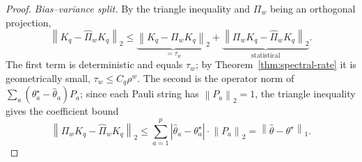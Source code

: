 \documentclass[aps,prxquantum,reprint,superscriptaddress,nofootinbib,amsmath,amssymb]{revtex4-2}
\newcommand{\norm}[1]{\left\lVert #1 \right\rVert}
\newcommand{\abs}[1]{\left\lvert #1 \right\rvert}
\begin{document}
\begin{proof}
\emph{Bias--variance split.} By the triangle inequality and $\Pi_w$ being an orthogonal projection,
\begin{equation}
    \norm{K_q-\widehat\Pi_wK_q}_2\leq\underbrace{\norm{K_q-\Pi_wK_q}_2}_{=\tau_w}+\underbrace{\norm{\Pi_wK_q-\widehat\Pi_wK_q}_2}_{\text{statistical}}.
    \label{eq:split}
\end{equation}
The first term is deterministic and equals $\tau_w$; by Theorem~\ref{thm:spectral-rate} it is geometrically small, $\tau_w\leq C_q\rho^w$. The second is the operator norm of $\sum_a(\theta_a^\star-\hat\theta_a)P_a$; since each Pauli string has $\norm{P_a}_2=1$, the triangle inequality gives the coefficient bound
\begin{equation}
    \norm{\Pi_wK_q-\widehat\Pi_wK_q}_2\leq\sum_{a=1}^{p}\abs{\hat\theta_a-\theta_a^\star}\cdot\norm{P_a}_2=\norm{\hat\theta-\theta^\star}_1 .
    \label{eq:op-to-coeff}
\end{equation}


\end{proof}
\end{document}
